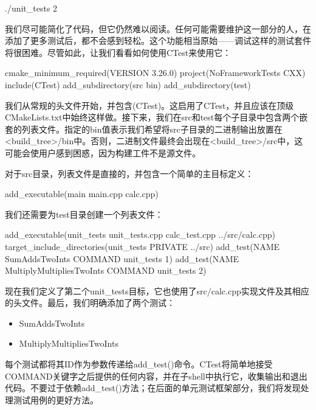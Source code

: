 \begin{shell}
./unit_tests 2
\end{shell}

我们尽可能简化了代码，但它仍然难以阅读。任何可能需要维护这一部分的人，在添加了更多测试后，都不会感到轻松。这个功能相当原始——调试这样的测试套件将很困难。尽管如此，让我们看看如何使用CTest来使用它：


\begin{cmake}
cmake_minimum_required(VERSION 3.26.0)
project(NoFrameworkTests CXX)
include(CTest)
add_subdirectory(src bin)
add_subdirectory(test)
\end{cmake}

我们从常规的头文件开始，并包含(CTest)。这启用了CTest，并且应该在顶级CMakeLists.txt中始终这样做。接下来，我们在src和test每个子目录中包含两个嵌套的列表文件。指定的bin值表示我们希望将src子目录的二进制输出放置在<build\_tree>/bin中。否则，二进制文件最终会出现在<build\_tree>/src中，这可能会使用户感到困惑，因为构建工件不是源文件。

对于src目录，列表文件是直接的，并包含一个简单的主目标定义：


\begin{cmake}
add_executable(main main.cpp calc.cpp)
\end{cmake}

我们还需要为test目录创建一个列表文件：


\begin{cmake}
add_executable(unit_tests
               unit_tests.cpp
               calc_test.cpp
               ../src/calc.cpp)
target_include_directories(unit_tests PRIVATE ../src)
add_test(NAME SumAddsTwoInts COMMAND unit_tests 1)
add_test(NAME MultiplyMultipliesTwoInts COMMAND unit_tests 2)
\end{cmake}

现在我们定义了第二个unit\_tests目标，它也使用了src/calc.cpp实现文件及其相应的头文件。最后，我们明确添加了两个测试：

\begin{itemize}
\item
SumAddsTwoInts

\item
MultiplyMultipliesTwoInts
\end{itemize}

每个测试都将其ID作为参数传递给add\_test()命令。CTest将简单地接受COMMAND关键字之后提供的任何内容，并在子shell中执行它，收集输出和退出代码。不要过于依赖add\_test()方法；在后面的单元测试框架部分，我们将发现处理测试用例的更好方法。

